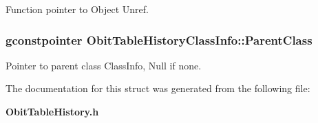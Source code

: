 Function pointer to Object Unref. 

\subsubsection{\setlength{\rightskip}{0pt plus 5cm}gconstpointer {\bf Obit\-Table\-History\-Class\-Info::Parent\-Class}}\label{structObitTableHistoryClassInfo_o3}


Pointer to parent class Class\-Info, Null if none. 



The documentation for this struct was generated from the following file:\begin{CompactItemize}
\item 
{\bf Obit\-Table\-History.h}\end{CompactItemize}
